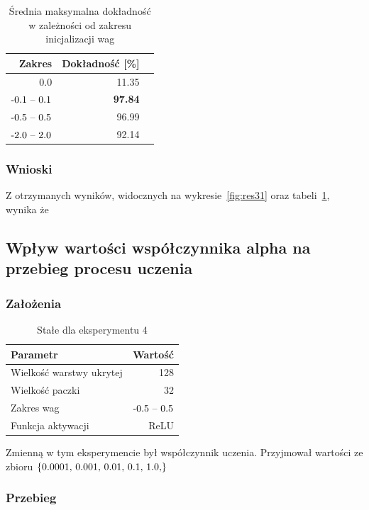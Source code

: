 \documentclass{article}
\begin{document}
\begin{table}[H]
	\caption{Średnia maksymalna dokładność w zależności od zakresu inicjalizacji wag}
	\label{tabela-res-31}
	\centering
	\begin{tabular}{rrr}
		\toprule
		Zakres            & Dokładność [\%] \\
		\midrule
		0.0               & 11.35              \\
		\($-0.1 -- 0.1$\) & \textbf{97.84}     \\
		\($-0.5 -- 0.5$\) & 96.99              \\
		\($-2.0 -- 2.0$\) & 92.14              \\
		\bottomrule
	\end{tabular}
\end{table}

\subsubsection*{Wnioski}

Z otrzymanych wyników, widocznych na wykresie~\ref{fig:res31} oraz tabeli~\ref{tabela-res-31}, wynika że

\newpage
\subsection{Wpływ wartości współczynnika alpha na przebieg procesu uczenia}
\subsubsection*{Założenia}
\begin{table}[H]
	\caption{Stałe dla eksperymentu 4}
	\label{tabela-const-4}
	\centering
	\begin{tabular}{lr}
		\toprule
		Parametr                   & Wartość         \\
		\midrule
		Wielkość warstwy ukrytej & 128               \\
		Wielkość paczki          & 32                \\
		Zakres wag                 & \($-0.5 -- 0.5$\) \\
		Funkcja aktywacji          & ReLU              \\
		\bottomrule
	\end{tabular}
\end{table}

Zmienną w tym eksperymencie był współczynnik uczenia. Przyjmował wartości ze zbioru \(\{$0.0001, 0.001, 0.01, 0.1, 1.0,$\}\)
\subsubsection*{Przebieg}
\end{document}
